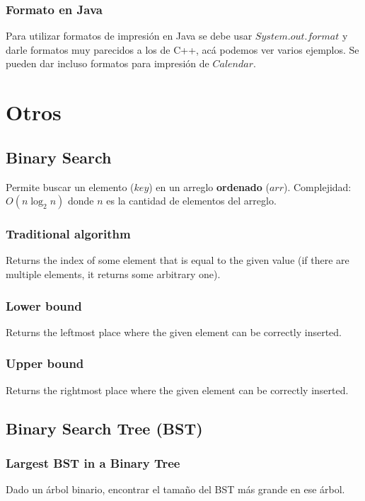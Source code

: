 \documentclass[10pt,letterpaper,twocolumn]{article}
\newcommand{\source}[1]{
  
  \dotfill
}
\begin{document}
    \subsubsection{Formato en Java}
    Para utilizar formatos de impresión en Java se debe usar $System.out.format$ y darle formatos muy parecidos a los de C++, acá podemos ver varios ejemplos. Se pueden dar incluso formatos para impresión de $Calendar$.
    \source{./src/printFormatJava.java}

\section{Otros}
  \subsection{Binary Search}
    Permite buscar un elemento ($key$) en un arreglo \textbf{ordenado} ($arr$).
    Complejidad: $O(n \log_2 n)$ donde $n$ es la cantidad de elementos del arreglo.\\
    \source{./src/binarySearch.cpp}
    \subsubsection{Traditional algorithm}
      Returns the index of some element that is equal to the given value (if there are multiple
      elements, it returns some arbitrary one).
      \source{./src/binary_search.cpp}
    \subsubsection{Lower bound}
      Returns the leftmost place where the given element can be correctly inserted.
      \source{./src/lower_bound.cpp}
    \subsubsection{Upper bound}
      Returns the rightmost place where the given element can be correctly inserted.
      \source{./src/upper_bound.cpp}
  \subsection{Binary Search Tree (BST)}
    \subsubsection{Largest BST in a Binary Tree}
      Dado un árbol binario, encontrar el tamaño del BST más grande en ese árbol.
      \source{./src/largest_bst.java}
\end{document}
